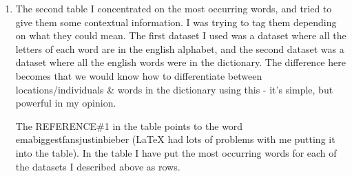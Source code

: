 \documentclass[11pt, oneside]{article}
\begin{document}
\begin{enumerate}
\item The second table I concentrated on the most occurring words, and tried to give them some contextual information. I was trying to tag them depending on what they could mean. The first dataset I used was a dataset where all the letters of each word are in the english alphabet, and the second dataset was a dataset where all the english words were in the dictionary. The difference here becomes that we would know how to differentiate between locations/individuals \& words in the dictionary using this - it's simple, but powerful in my opinion. 
\par The REFERENCE\#1 in the table points to the word emabiggestfansjustinbieber (LaTeX had lots of problems with me putting it into the table). In the table I have put the most occurring words for each of the datasets I described above as rows.


\end{enumerate}
\end{document}
